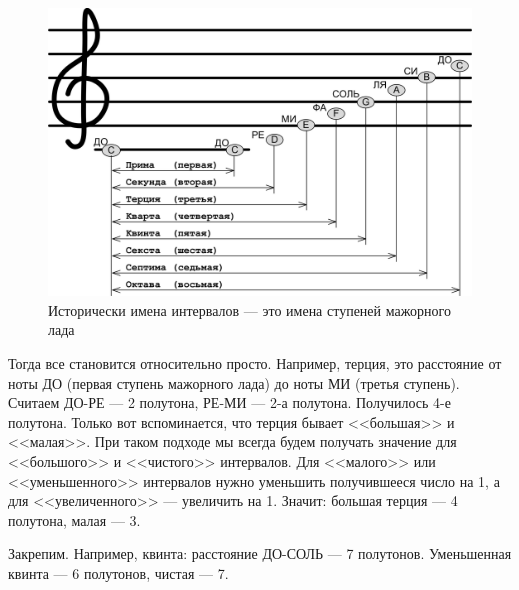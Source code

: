 \begin{figure}[!ht]
    \centering
    \includegraphics{fig/intervals/interval-names} 
    \caption{Исторически имена интервалов --- это имена ступеней мажорного лада}\label{fig:harmony:interval:names}
\end{figure} 

Тогда все становится относительно просто. Например, терция, это расстояние от ноты ДО (первая ступень мажорного лада) до ноты МИ (третья ступень). Считаем ДО-РЕ --- 2 полутона, РЕ-МИ --- 2-а полутона. Получилось 4-е полутона. Только вот вспоминается, что терция бывает <<большая>> и <<малая>>. При таком подходе мы всегда будем получать значение для <<большого>> и <<чистого>> интервалов. Для <<малого>> или <<уменьшенного>> интервалов нужно уменьшить получившееся число на 1, а для <<увеличенного>> --- увеличить на 1. Значит: большая терция --- 4 полутона, малая --- 3.

Закрепим. Например, квинта: расстояние ДО-СОЛЬ --- 7 полутонов. Уменьшенная квинта --- 6 полутонов, чистая --- 7.
